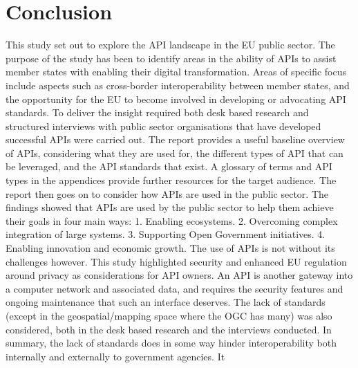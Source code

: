 \chapter{Conclusion}

\ifpdf
\graphicspath{{Conclusion/Figs/Raster/}{Conclusion/Figs/PDF/}{Conclusion/Figs/}}
\else
\graphicspath{{Conclusion/Figs/Vector/}{Conclusion/Figs/}}
\fi

This study set out to explore the API landscape in the EU public sector. The purpose of the study has been
to identify areas in the ability of APIs to assist member states with enabling their digital transformation.
Areas of specific focus include aspects such as cross-border interoperability between member states, and
the opportunity for the EU to become involved in developing or advocating API standards. To deliver the
insight required both desk based research and structured interviews with public sector organisations that
have developed successful APIs were carried out.
The report provides a useful baseline overview of APIs, considering what they are used for, the different
types of API that can be leveraged, and the API standards that exist. A glossary of terms and API types in
the appendices provide further resources for the target audience. The report then goes on to consider how
APIs are used in the public sector. The findings showed that APIs are used by the public sector to help
them achieve their goals in four main ways:
1. Enabling ecosystems.
2. Overcoming complex integration of large systems.
3. Supporting Open Government initiatives.
4. Enabling innovation and economic growth.
The use of APIs is not without its challenges however. This study highlighted security and enhanced EU
regulation around privacy as considerations for API owners. An API is another gateway into a computer
network and associated data, and requires the security features and ongoing maintenance that such an
interface deserves.
The lack of standards (except in the geospatial/mapping space where the OGC has many) was also
considered, both in the desk based research and the interviews conducted. In summary, the lack of
standards does in some way hinder interoperability both internally and externally to government agencies. It
